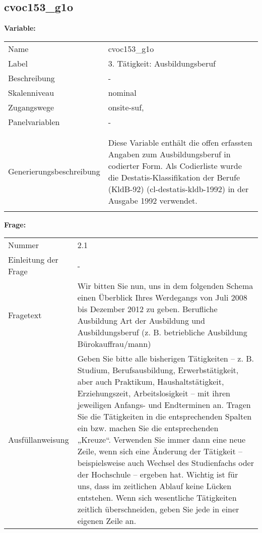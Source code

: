 	
	
	\subsection{cvoc153\_g1o}
	\label{subSection:cvoc153_g1o}

	\noindent\textbf{Variable:}\\
		\begin{tabular}{lL{11.3cm}}
			\label{tableVariable:cvoc153_g1o}
			Name & cvoc153\_g1o \\
			Label & 3. Tätigkeit: Ausbildungsberuf \\
			Beschreibung & - \\
			Skalenniveau & nominal \\
			Zugangswege &
				onsite-suf,
 \\
			Panelvariablen & -
			 \\
			 \\
 \\
					Generierungsbeschreibung & Diese Variable enthält die offen erfassten Angaben zum Ausbildungsberuf in codierter Form. Als Codierliste wurde die Destatis-Klassifikation der Berufe (KldB-92) (cl-destatis-kldb-1992) in der Ausgabe 1992 verwendet. 
				 \\	
			 \\
		\end{tabular}

		\vspace*{1 cm}
		\noindent\textbf{Frage:}\\
		\begin{tabular}{lL{11.3cm}}
			\label{tableQuestion:cvoc153_g1o}
			Nummer & 2.1 \\
			Einleitung der Frage & - \\
			Fragetext & Wir bitten Sie nun, uns in dem folgenden Schema einen Überblick Ihres Werdegangs von Juli 2008 bis Dezember 2012 zu geben.
Berufliche Ausbildung
Art der Ausbildung und Ausbildungsberuf
(z. B. betriebliche Ausbildung Bürokauffrau/mann) \\
			Ausfüllanweisung & Geben Sie bitte alle bisherigen Tätigkeiten – z. B. Studium, Berufsausbildung, Erwerbstätigkeit, aber auch Praktikum, Haushaltstätigkeit,
Erziehungszeit, Arbeitslosigkeit – mit ihren jeweiligen Anfangs- und Endterminen an. Tragen Sie die Tätigkeiten in die entsprechenden Spalten ein bzw. machen Sie die entsprechenden „Kreuze“. Verwenden Sie immer dann eine neue Zeile, wenn sich eine Änderung der Tätigkeit – beispielsweise auch Wechsel des Studienfachs oder der Hochschule – ergeben hat. Wichtig ist für uns, dass im zeitlichen Ablauf keine Lücken entstehen. Wenn sich wesentliche Tätigkeiten zeitlich überschneiden, geben Sie jede in einer eigenen Zeile an. \\
		\end{tabular}





